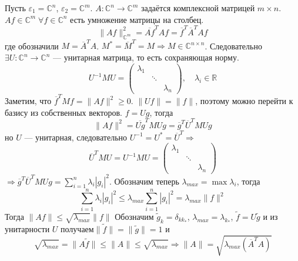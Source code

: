 \documentclass[12pt]{article}
\begin{document}
\begin{Prim}
    Пусть $\varepsilon_1 = \mathbb C^n$, $\varepsilon_2 = \mathbb C^m$.
    $A : \mathbb C^n \to \mathbb C^m$ задаётся комплексной матрицей $m \times n$.
    $Af \in \mathbb C^m\; \forall f \in \mathbb C^n$ есть умножение матрицы на столбец.
    $$
    \|Af\|^2_{\mathbb C^m} = \overline{Af}^T Af = \overline{f}^T \overline{A}^T A f
    $$
    где обозначили $M = \overline{A}^T A$. 
    $M^*=\overline{M}^T=M \Rightarrow  M \in \mathbb C^{n \times n}$.
    Следовательно $\exists U : \mathbb C^n \to \mathbb C^n$ --- унитарная матрица, то есть сохраняющая норму.
    $$
    U^{-1}MU =
    \left(
        \begin{array}{ccc}
            \lambda_1 & \phantom{x} & \phantom{x}\\
            \phantom{x} & \ddots & \phantom{x}\\
            \phantom{x} & \phantom{x} & \lambda_n
        \end{array}
    \right), \quad \lambda_i \in \mathbb R
    $$
    Заметим, что $\overline{f}^TMf = \|Af\|^2 \ge 0$.
    $\|Uf\|=\|f\|$, поэтому можно перейти к базису из собственных векторов.
    $f=Ug$, тогда
    $$
    \|Af\|^2 = \overline{Ug}^TM Ug = \overline{g}^T \overline{U}^T M Ug
    $$
     но $U$ --- унитарная, следовательно
    $U^{-1} = U^* = \overline{U}^T \Rightarrow$
    $$
    \overline{U}^T M U = U^{-1} M U =
    \left(
        \begin{array}{ccc}
            \lambda_1 & \phantom{x} & \phantom{x}\\
            \phantom{x} & \ddots & \phantom{x}\\
            \phantom{x} & \phantom{x} & \lambda_n
        \end{array}
    \right)
    $$
    $\Rightarrow \overline{g}^T \overline{U}^T M Ug = \sum\limits_{i = 1}^n \lambda_i |g_i|^2$.
    Обозначим теперь $\lambda_{max} = \max\lambda_i$, тогда 
    $$
    \sum\limits_{i = 1}^n \lambda_i |g_i|^2 \le \lambda_{max}\sum\limits_{i = 1}^n |g_i|^2 = \lambda_{max} \|f\|^2
    $$
    Тогда $\|Af\| \le \sqrt{\lambda_{max}}\|f\|$
    Обозначим $\tilde{g}_k = \delta_{kk_*}$, $\lambda_{max} = \lambda_{k_*}$, $\tilde{f} = U\tilde{g}$ и из унитарности $U$ получаем$\|\tilde{f}\| = \|\tilde{g}\| = 1$ и 
    $$
    \sqrt{\lambda_{max}} = \|A\tilde{f}\| \le \|A\| \le \sqrt{\lambda_{max}} \Rightarrow \|A\| = \sqrt{\lambda_{max}(\overline{A}^T A)}
    $$
\end{Prim}
\end{document}
